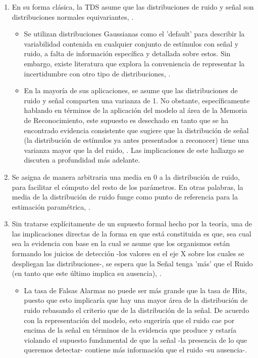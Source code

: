 \begin{enumerate}
\item En su forma clásica, la TDS asume que las distribuciones de ruido y señal son distribuciones normales equivariantes, \parencite{Stainslaw1999}.\\
  \begin{itemize}
  \item Se utilizan distribuciones Gaussianas como el 'default' para describir la variabilidad contenida en cualquier conjunto de estímulos con señal y ruido, a falta de información específica y detallada sobre estos. Sin embargo, existe literatura que explora la conveniencia de representar la incertidumbre con otro tipo de distribuciones, \parencite{Wickens, WeijiMa2010}.\\
  \item En la mayoría de sus aplicaciones, se asume que las distribuciones de ruido y señal comparten una varianza de 1. No obstante, específicamente hablando en términos de la aplicación del modelo al área de la Memoria de Reconocimiento, este supuesto es desechado en tanto que se ha encontrado evidencia consistente que sugiere que la distribución de señal (la distribución de estímulos ya antes presentados a reconocer) tiene una varianza mayor que la del ruido, \parencite{Wixted2007}. Las implicaciones de este hallazgo se discuten a profundidad más adelante.\\
  \end{itemize}
\item Se asigna de manera arbitraria una media en 0 a la distribución de ruido, para facilitar el cómputo del resto de los parámetros. En otras palabras, la media de la distribución de ruido funge como punto de referencia para la estimación paramétrica, \parencite{Wickens, Gescheider}.\\
\item Sin tratarse explícitamente de un supuesto formal hecho por la teoría, una de las implicaciones directas de la forma en que está constituida es que, sea cual sea la evidencia con base en la cual se asume que los organismos están formando los juicios de detección -los valores en el eje X sobre los cuales se despliegan las distribuciones-, se espera que la Señal tenga 'más' que el Ruido (en tanto que este último implica su ausencia), \parencite{Stainslaw1999}.\\
  \begin{itemize}
  \item La tasa de Falsas Alarmas no puede ser más grande que la tasa de Hits, puesto que esto implicaría que hay una mayor área de la distribución de ruido rebasando el criterio que de la distribución de la señal. De acuerdo con la representación del modelo, esto sugeriría que el ruido cae por encima de la señal en términos de la evidencia que produce y estaría violando el supuesto fundamental de que la señal -la presencia de lo que queremos detectar- contiene más información que el ruido -su ausencia-.\\
  \end{itemize}
\end{enumerate}

